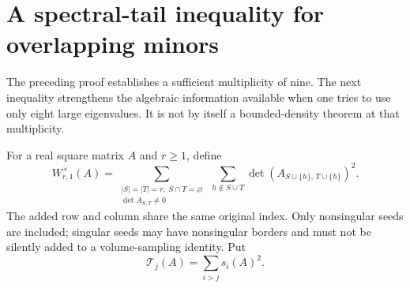 \documentclass[11pt]{article}
\numberwithin{equation}{section}
\theoremstyle{definition}\newtheorem{definition}[theorem]{Definition}
\theoremstyle{remark}\newtheorem{remark}[theorem]{Remark}
\newcommand{\1}{\mathbf 1}\newcommand{\diag}{\operatorname{diag}}
\begin{document}
\section{A spectral-tail inequality for overlapping minors}\label{sec:overlap}
The preceding proof establishes a sufficient multiplicity of nine. The next inequality strengthens the algebraic information available when one tries to use only eight large eigenvalues. It is not by itself a bounded-density theorem at that multiplicity.

For a real square matrix $A$ and $r\ge1$, define
\begin{equation}\label{eq:W}
 W_{r,1}^{\times}(A)=
 \sum_{\substack{|S|=|T|=r,\ S\cap T=\varnothing\\\det A_{S,T}\ne0}}
 \ \sum_{h\notin S\cup T}\det(A_{S\cup\{h\},\,T\cup\{h\}})^2.
\end{equation}
The added row and column share the same original index. Only nonsingular seeds are included; singular seeds may have nonsingular borders and must not be silently added to a volume-sampling identity. Put
\[
 \mathcal T_j(A)=\sum_{i>j}s_i(A)^2.
\]
\end{document}
